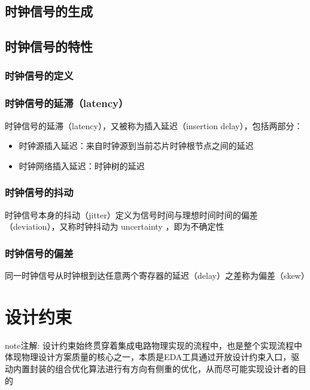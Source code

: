 \documentclass[letterpaper,10pt,english]{sphinxmanual}
\begin{document}
\subsection{时钟信号的生成}
\label{\detokenize{chapter1/_u65f6_u949f_u4fe1_u53f7:id2}}

\subsection{时钟信号的特性}
\label{\detokenize{chapter1/_u65f6_u949f_u4fe1_u53f7:id3}}

\subsubsection{时钟信号的定义}
\label{\detokenize{chapter1/_u65f6_u949f_u4fe1_u53f7:id4}}

\subsubsection{时钟信号的延滞（latency）}
\label{\detokenize{chapter1/_u65f6_u949f_u4fe1_u53f7:latency}}
\sphinxAtStartPar
时钟信号的延滞（latency），又被称为插入延迟（insertion delay），包括两部分：
\begin{itemize}
\item {} 
\sphinxAtStartPar
时钟源插入延迟：来自时钟源到当前芯片时钟根节点之间的延迟

\item {} 
\sphinxAtStartPar
时钟网络插入延迟：时钟树的延迟

\end{itemize}


\subsubsection{时钟信号的抖动}
\label{\detokenize{chapter1/_u65f6_u949f_u4fe1_u53f7:id5}}
\sphinxAtStartPar
时钟信号本身的抖动（jitter）定义为信号时间与理想时间时间的偏差（deviation），又称时钟抖动为 uncertainty ，即为不确定性


\subsubsection{时钟信号的偏差}
\label{\detokenize{chapter1/_u65f6_u949f_u4fe1_u53f7:id6}}
\sphinxAtStartPar
同一时钟信号从时钟根到达任意两个寄存器的延迟（delay）之差称为偏差（skew）


\section{设计约束}
\label{\detokenize{chapter1/_u8bbe_u8ba1_u7ea6_u675f:id1}}\label{\detokenize{chapter1/_u8bbe_u8ba1_u7ea6_u675f::doc}}
\begin{sphinxadmonition}{note}{注解:}
\sphinxAtStartPar
设计约束始终贯穿着集成电路物理实现的流程中，也是整个实现流程中体现物理设计方案质量的核心之一，本质是EDA工具通过开放设计约束入口，驱动内置封装的组合优化算法进行有方向有侧重的优化，从而尽可能实现设计者的目的
\end{sphinxadmonition}
\end{document}
